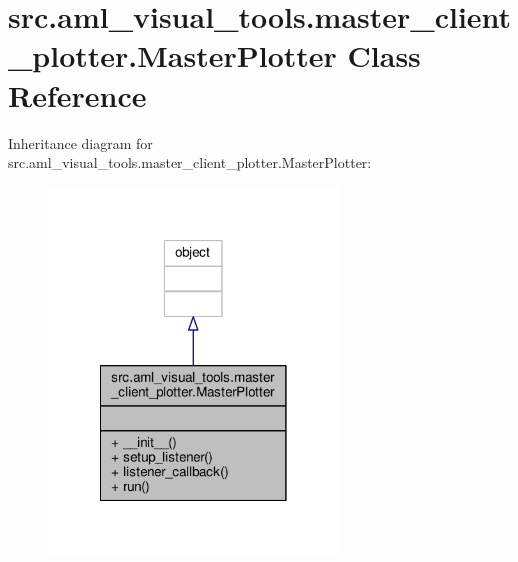 \hypertarget{classsrc_1_1aml__visual__tools_1_1master__client__plotter_1_1_master_plotter}{\section{src.\-aml\-\_\-visual\-\_\-tools.\-master\-\_\-client\-\_\-plotter.\-Master\-Plotter Class Reference}
\label{classsrc_1_1aml__visual__tools_1_1master__client__plotter_1_1_master_plotter}
}


Inheritance diagram for src.\-aml\-\_\-visual\-\_\-tools.\-master\-\_\-client\-\_\-plotter.\-Master\-Plotter\-:\nopagebreak
\begin{figure}[H]
\begin{center}
\leavevmode
\includegraphics[width=218pt]{classsrc_1_1aml__visual__tools_1_1master__client__plotter_1_1_master_plotter__inherit__graph}
\end{center}
\end{figure}



